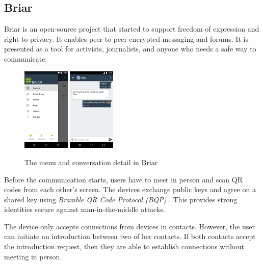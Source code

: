 \documentclass[conference,compsoc]{IEEEtran}
\begin{document}
\subsection{Briar}

Briar \cite{briar_gplay} is an open-source project that started to support freedom of expression and right to privacy. It enables peer-to-peer encrypted messaging and forums. It is presented as a tool for activists, journalists, and anyone who needs a safe way to communicate.

\begin{figure}[h]
  \centering
  \includegraphics[width=0.2\textwidth]{briar1}
  \includegraphics[width=0.2\textwidth]{briar2}
  \caption{The menu and conversation detail in Briar \cite{briar_gplay}}
\end{figure}

Before the communication starts, users have to meet in person and scan QR codes from each other's screen. The devices exchange public keys and agree on a shared key using \textit{Bramble QR Code Protocol (BQP)} \cite{briar_bqp}.
This provides strong identities secure against man-in-the-middle attacks.

The device only accepts connections from devices in contacts. However, the user can initiate an introduction between two of her contacts. If both contacts accept the introduction request, then they are able to establish connections without meeting in person.
\end{document}
